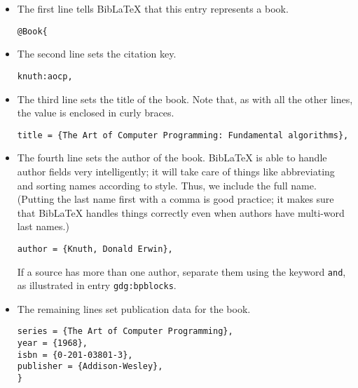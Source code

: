 \documentclass{article}
\newcommand*{\code}[1]{\texttt{#1}}
\begin{document}
\begin{itemize}
\item
  The first line tells Bib\LaTeX{} that this entry represents a book.
\begin{verbatim}
@Book{
\end{verbatim}

\item
  The second line sets the citation key.
\begin{verbatim}
knuth:aocp,
\end{verbatim}

\item
  The third line sets the title of the book.
  Note that, as with all the other lines, the value is enclosed in curly braces.
\begin{verbatim}
title = {The Art of Computer Programming: Fundamental algorithms},
\end{verbatim}

\item
  The fourth line sets the author of the book.
  Bib\LaTeX{} is able to handle author fields very intelligently; it will take care of things like abbreviating and sorting names according to style.
  Thus, we include the full name.
  (Putting the last name first with a comma is good practice; it makes sure that Bib\LaTeX{} handles things correctly even when authors have multi-word last names.)
\begin{verbatim}
author = {Knuth, Donald Erwin},
\end{verbatim}

  If a source has more than one author, separate them using the keyword \code{and}, as illustrated in entry \code{gdg:bpblocks}.

\item
  The remaining lines set publication data for the book.
\begin{verbatim}
series = {The Art of Computer Programming},
year = {1968},
isbn = {0-201-03801-3},
publisher = {Addison-Wesley},
}
\end{verbatim}
\end{itemize}
\end{document}
